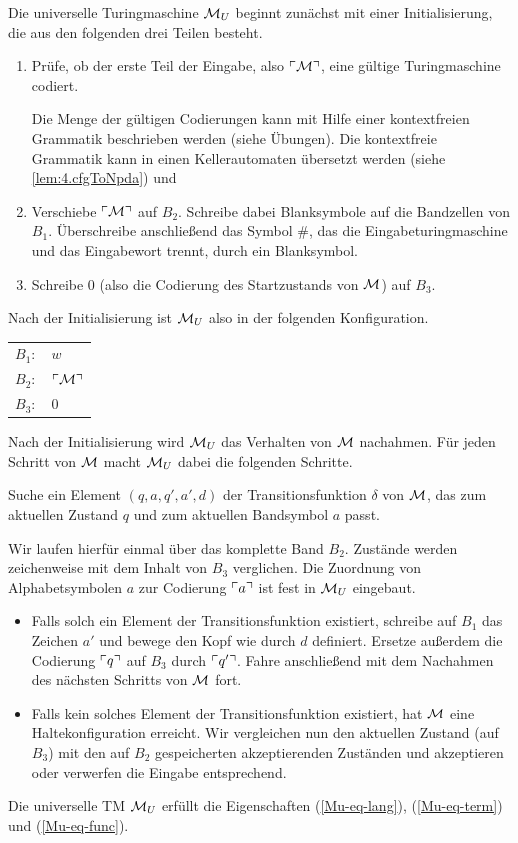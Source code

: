 Die universelle Turingmaschine $\mathcal{M}_U$ beginnt zunächst mit einer Initialisierung, die aus den folgenden drei Teilen besteht.

\begin{enumerate}
 \item Prüfe, ob der erste Teil der Eingabe, also $\ulcorner \mathcal{M} \urcorner$, eine gültige Turingmaschine codiert.
 
 Die Menge der gültigen Codierungen kann mit Hilfe einer kontextfreien Grammatik beschrieben werden (siehe Übungen).
 Die kontextfreie Grammatik kann in einen Kellerautomaten übersetzt werden (siehe \autoref{lem:4.cfgToNpda})
 und 
 
 \item Verschiebe $\ulcorner \mathcal{M} \urcorner$ auf $B_2$. Schreibe dabei Blanksymbole auf die Bandzellen von $B_1$.
 Überschreibe anschließend das Symbol $\#$, das die Eingabeturingmaschine und das Eingabewort trennt, durch ein Blanksymbol.
 
 \item Schreibe $0$ (also die Codierung des Startzustands von $\mathcal{M}$) auf $B_3$.
\end{enumerate}

Nach der Initialisierung ist $\mathcal{M}_U$ also in der folgenden Konfiguration.
\begin{center}
	\begin{tabular}{rl}
		$B_1:$ & $w$\\
		$B_2:$ & $\ulcorner \mathcal{M} \urcorner$\\
		$B_3:$ & $0$
	\end{tabular}
\end{center}

Nach der Initialisierung wird $\mathcal{M}_U$ das Verhalten von $\mathcal{M}$ nachahmen.
Für jeden Schritt von $\mathcal{M}$ macht $\mathcal{M}_U$ dabei die folgenden Schritte.

Suche ein Element $(q, a, q', a', d)$ der Transitionsfunktion $\delta$ von $\mathcal{M}$, das zum aktuellen Zustand $q$ und zum aktuellen Bandsymbol $a$ passt.

Wir laufen hierfür einmal über das komplette Band $B_2$. 
Zustände werden zeichenweise mit dem Inhalt von $B_3$ verglichen.
Die Zuordnung von Alphabetsymbolen $a$ zur Codierung $\ulcorner a \urcorner$ ist fest in $\mathcal{M}_U$ eingebaut.

\begin{itemize}
	
	\item Falls solch ein Element der Transitionsfunktion existiert,
	schreibe auf $B_1$ das Zeichen $a'$ und bewege den Kopf wie durch $d$ definiert.
	Ersetze außerdem die Codierung $\ulcorner q \urcorner$ auf $B_3$ durch $\ulcorner q' \urcorner$.
	Fahre anschließend mit dem Nachahmen des nächsten Schritts von $\mathcal{M}$ fort.
	
	\item Falls kein solches Element der Transitionsfunktion existiert, hat $\mathcal{M}$ eine Haltekonfiguration erreicht.
	Wir vergleichen nun den aktuellen Zustand (auf $B_3$) mit den auf $B_2$ gespeicherten akzeptierenden Zuständen und akzeptieren oder verwerfen die Eingabe entsprechend.
	
\end{itemize}

\begin{Satz}[name={[Universelle \ac{TM}]}]
	Die universelle \ac{TM} $\mathcal{M}_U$ erfüllt die Eigenschaften (\ref{Mu-eq-lang}), (\ref{Mu-eq-term}) und (\ref{Mu-eq-func}).
\end{Satz}


